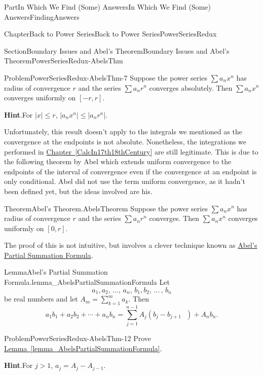 \documentclass[oneside,10pt,]{book}
\newcommand{\blocktitlefont}{\relax}
\newcommand{\xreffont}{\relax}
\numberwithin{equation}{part}
\newcommand{\abs}[1]{\left|#1\right|}
\begin{document}
\begin{partptx}{Part}{In Which We Find (Some) Answers}{}{In Which We Find (Some) Answers}{}{}{FindingAnswers}
\begin{chapterptx}{Chapter}{Back to Power Series}{}{Back to Power Series}{}{}{PowerSeriesRedux}
\begin{sectionptx}{Section}{Boundary Issues and Abel's Theorem}{}{Boundary Issues and Abel's Theorem}{}{}{PowerSeriesRedux-AbelsThm}
\begin{problem}{Problem}{}{PowerSeriesRedux-AbelsThm-7}
Suppose the power series \(\sum a_nx^n\) has radius of convergence \(r\) and the series \(\sum a_nr^n\) converges absolutely.  Then \(\sum a_nx^n\) converges uniformly on \([-r,r]\).%
\par\smallskip%
\noindent\textbf{\blocktitlefont Hint}.\hypertarget{PowerSeriesRedux-AbelsThm-7-4}{}\quad{}For \(\abs{x}\leq r\), \(|a_nx^n|\leq |a_nr^n|\).%
\end{problem}
Unfortunately, this result doesn't apply to the integrals we mentioned as the convergence at the endpoints is not absolute. Nonetheless, the integrations we performed in \hyperref[CalcIn17th18thCentury]{Chapter~{\xreffont\ref{CalcIn17th18thCentury}}} are still legitimate. This is due to the following theorem by Abel which extends uniform convergence to the endpoints of the interval of convergence even if the convergence at an endpoint is only conditional.  Abel did not use the term uniform convergence, as it hadn't been defined yet, but the ideas involved are his.%
\begin{theorem}{Theorem}{Abel's Theorem.}{}{AbelsTheorem}%
%
Suppose the power series \(\sum a_nx^n\) has radius of convergence \(r\) and the series \(\sum a_nr^n\) converges.  Then \(\sum a_nx^n\) converges uniformly on \([0, r]\).%
\end{theorem}
The proof of this is not intuitive, but involves a clever technique known as \hyperref[lemma_AbelsPartialSummationFormula]{Abel's Partial Summation Formula}.%
\begin{lemma}{Lemma}{Abel's Partial Summation Formula.}{}{lemma_AbelsPartialSummationFormula}%
Let%
\begin{equation*}
a_1,a_2,\,\ldots,\,a_n,\,b_1,b_2,\,\ldots\,,\,b_n
\end{equation*}
be real numbers and let \(A_m=\displaystyle\sum_{k=1}^ma_k\).  Then%
\begin{equation*}
a_1b_1+a_2b_2+\cdots+a_nb_n=\sum_{j=1}^{n-1}A_j\left(b_j-b_{j+1}\text{ } \right)+A_nb_n\text{.}
\end{equation*}
%
\end{lemma}
\begin{problem}{Problem}{}{PowerSeriesRedux-AbelsThm-12}%
Prove \hyperref[lemma_AbelsPartialSummationFormula]{Lemma~{\xreffont\ref{lemma_AbelsPartialSummationFormula}}}.%
\par\smallskip%
\noindent\textbf{\blocktitlefont Hint}.\hypertarget{PowerSeriesRedux-AbelsThm-12-3}{}\quad{}For \(j>1\), \(a_j=A_j-A_{j-1}\).%
\end{problem}

\end{sectionptx}
\end{chapterptx}
\end{partptx}
\end{document}
